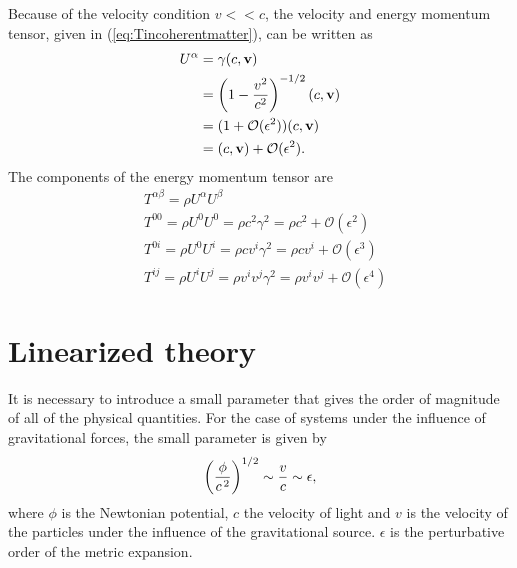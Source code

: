 Because of the velocity condition $v<<c$, the velocity and energy momentum tensor, given in (\ref{eq:Tincoherentmatter}), can be written as
 \begin{align}
        U^{\alpha} &= \gamma(c, \textbf{v})\\
        \notag
        &=\left(1-\frac{v^2}{c^2}\right)^{-1/2}(c, \textbf{v})\\
          \notag
        &=(1+\mathcal{O}(\epsilon^2))(c, \textbf{v})\\
        &=(c, \textbf{v}) + \mathcal{O}(\epsilon^2).
    \end{align}
   The components of the energy momentum tensor are
   \begin{subequations}
   \label{eq: expansionenergymomentum}
 \begin{align}
 \label{eq: Tmnused}
        &T^{\alpha\beta}= \rho U^{\alpha}U^{\beta}  \\
         \label{eq: T00used}
        &T^{00}= \rho U^{0}U^{0}  =\rho c^2 \gamma^2 = \rho c^2 + \mathcal{O}(\epsilon^2)\\
         \label{eq: Toiused}
        &T^{0i}= \rho U^{0}U^{i}  =\rho c v^i \gamma^2 = \rho c v^i + \mathcal{O}(\epsilon^3)\\
         \label{eq: Tijused}
        &T^{ij}= \rho U^{i}U^{j}  =\rho v^i v^j  \gamma^2 =\rho v^i v^j+ \mathcal{O}(\epsilon^4)  
    \end{align}
 \end{subequations}
 
    
\section{Linearized theory}
It is necessary to introduce a small parameter that gives the order of magnitude of all of the physical quantities. For the case of systems under the influence of gravitational forces, the small parameter is given by
\begin{equation}
	 \left(\frac{\phi}{c^{\hspace{0.05cm}2}}\right)^{1/2} \sim \frac{v}{c} \sim \epsilon,
	\label{eq:epsilon_parameter}
\end{equation}
where $\phi$ is the Newtonian potential, $c$ the velocity of light and $v$ is the velocity of the particles under the influence of the gravitational source.  $\epsilon$ is the perturbative order of the metric expansion.\\


